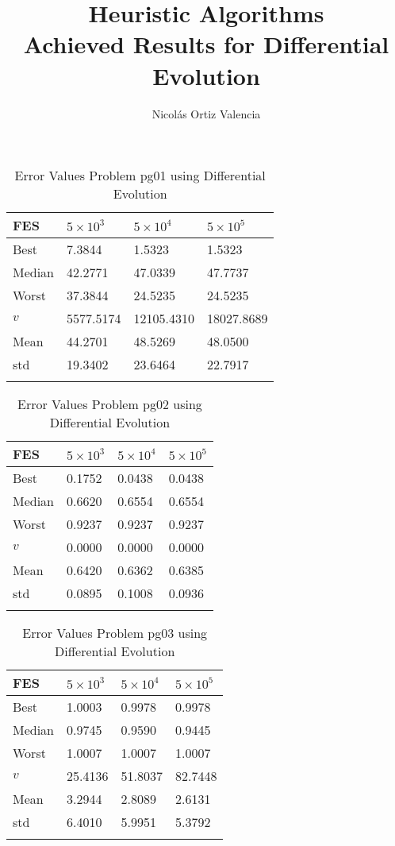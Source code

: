 \documentclass[10pt, a4paper]{book}
\title{
    Heuristic Algorithms \\
    \large Achieved Results for Differential Evolution\\
}
\author{Nicolás Ortiz Valencia}
\begin{document}
\maketitle


\begin{center}
\begin{longtable}{l l l l}
FES & $5 \times 10^{3}$ & $5 \times 10^{4}$ & $5 \times 10^{5}$ \\
\hline
Best & 7.3844 & 1.5323 & 1.5323 \\
Median & 42.2771 & 47.0339 & 47.7737 \\
Worst & 37.3844 & 24.5235 & 24.5235 \\
$v$ & 5577.5174 & 12105.4310 & 18027.8689 \\
Mean & 44.2701 & 48.5269 & 48.0500 \\
std & 19.3402 & 23.6464 & 22.7917 \\
\caption{ Error Values Problem pg01 using Differential Evolution }
\end{longtable}
\end{center}

\begin{center}
\begin{longtable}{l l l l}
FES & $5 \times 10^{3}$ & $5 \times 10^{4}$ & $5 \times 10^{5}$ \\
\hline
Best & 0.1752 & 0.0438 & 0.0438 \\
Median & 0.6620 & 0.6554 & 0.6554 \\
Worst & 0.9237 & 0.9237 & 0.9237 \\
$v$ & 0.0000 & 0.0000 & 0.0000 \\
Mean & 0.6420 & 0.6362 & 0.6385 \\
std & 0.0895 & 0.1008 & 0.0936 \\
\caption{ Error Values Problem pg02 using Differential Evolution }
\end{longtable}
\end{center}

\begin{center}
\begin{longtable}{l l l l}
FES & $5 \times 10^{3}$ & $5 \times 10^{4}$ & $5 \times 10^{5}$ \\
\hline
Best & 1.0003 & 0.9978 & 0.9978 \\
Median & 0.9745 & 0.9590 & 0.9445 \\
Worst & 1.0007 & 1.0007 & 1.0007 \\
$v$ & 25.4136 & 51.8037 & 82.7448 \\
Mean & 3.2944 & 2.8089 & 2.6131 \\
std & 6.4010 & 5.9951 & 5.3792 \\
\caption{ Error Values Problem pg03 using Differential Evolution }
\end{longtable}
\end{center}
\end{document}
